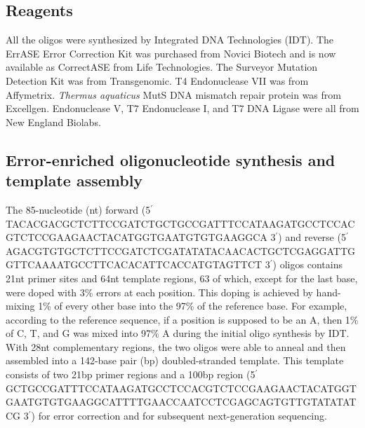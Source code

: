 \documentclass[letterpaper,12pt]{article}
\begin{document}
\subsection*{Reagents}
All the oligos were synthesized by Integrated DNA Technologies (IDT). The ErrASE Error Correction Kit was purchased from Novici Biotech and is now available as CorrectASE from Life Technologies. The Surveyor Mutation Detection Kit was from Transgenomic. T4 Endonuclease VII was from Affymetrix. \textit{Thermus aquaticus} MutS DNA mismatch repair protein was from Excellgen. Endonuclease V, T7 Endonuclease I, and T7 DNA Ligase were all from New England Biolabs.

\subsection*{Error-enriched oligonucleotide synthesis and template assembly}
 The 85-nucleotide (nt) forward (5$^\prime$ TACACGACGCTCTTCCGATCTGCTGCCGATTTCCATAAGATGCCTCCACGTCTCCGAAGAACTACATGGTGAATGTGTGAAGGCA 3$^\prime$) and reverse (5$^\prime$ AGACGTGTGCTCTTCCGATCTCGATATATACAACACTGCTCGAGGATTGGTTCAAAATGCCTTCACACATTCACCATGTAGTTCT 3$^\prime$) oligos contains 21nt primer sites and 64nt template regions, 63 of which, except for the last base, were doped with 3\% errors at each position. This doping is achieved by hand-mixing 1\% of every other base into the 97\% of the reference base. For example, according to the reference sequence, if a position is supposed to be an A, then 1\% of C, T, and G was mixed into 97\% A during the initial oligo synthesis by IDT. With 28nt complementary regions, the two oligos were able to anneal and then assembled into a 142-base pair (bp) doubled-stranded template. This template consists of two 21bp primer regions and a 100bp region (5$^\prime$ GCTGCCGATTTCCATAAGATGCCTCCA\-CGTCTCCGAAGAACTACATGGTGAATGTGTGA\-AGGC\-ATTTTGAACCAATCCTCGAGCAGTGTTGTATATATCG 3$^\prime$) for error correction and for subsequent next-generation sequencing.
\end{document}
